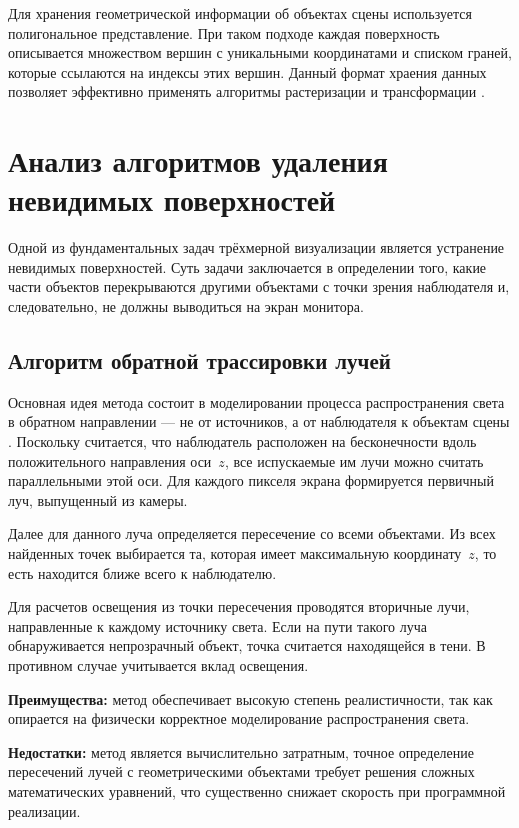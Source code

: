 Для хранения геометрической информации об объектах сцены используется полигональное представление. При таком подходе каждая поверхность описывается множеством вершин с уникальными координатами и списком граней, которые ссылаются на индексы этих вершин. Данный формат храения данных позволяет эффективно применять алгоритмы растеризации и трансформации \cite{rogers_base}.

\section{Анализ алгоритмов удаления невидимых поверхностей}

Одной из фундаментальных задач трёхмерной визуализации является устранение невидимых поверхностей. Суть задачи заключается в определении того, какие части объектов перекрываются другими объектами с точки зрения наблюдателя и, следовательно, не должны выводиться на экран монитора.

\subsection{Алгоритм обратной трассировки лучей}

Основная идея метода состоит в моделировании процесса распространения света в обратном направлении --- не от источников, а от наблюдателя к объектам сцены \cite{shikin_boreskov}. Поскольку считается, что наблюдатель расположен на бесконечности вдоль положительного направления оси~$z$, все испускаемые им лучи можно считать параллельными этой оси. Для каждого пикселя экрана формируется первичный луч, выпущенный из камеры.

Далее для данного луча определяется пересечение со всеми объектами. Из всех найденных точек выбирается та, которая имеет максимальную координату~$z$, то есть находится ближе всего к наблюдателю.

Для расчетов освещения из точки пересечения проводятся вторичные лучи, направленные к каждому источнику света. Если на пути такого луча обнаруживается непрозрачный объект, точка считается находящейся в тени. В противном случае учитывается вклад освещения.

\textbf{Преимущества:} метод обеспечивает высокую степень реалистичности, так как опирается на физически корректное моделирование распространения света.

\textbf{Недостатки:} метод является вычислительно затратным, точное определение пересечений лучей с геометрическими объектами требует решения сложных математических уравнений, что существенно снижает скорость при программной реализации.


